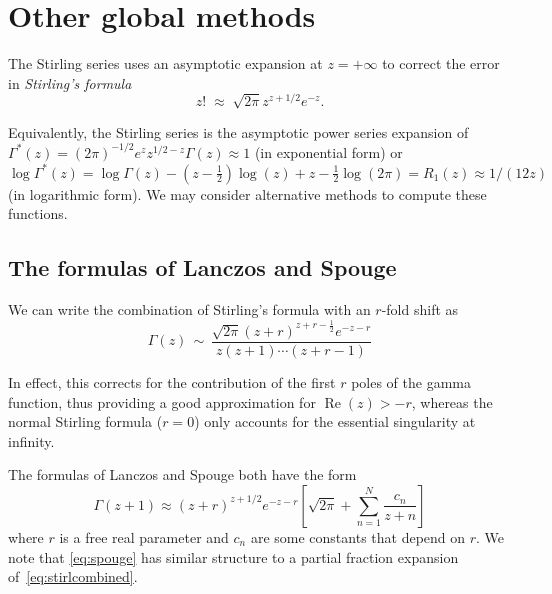 \documentclass[reqno]{amsart}
\theoremstyle{definition}
\begin{document}


\section{Other global methods}

\label{sect:global}


The Stirling series
uses an asymptotic
expansion at $z = +\infty$ to correct the error in \emph{Stirling's formula}
\begin{equation}
z! \; \approx \; \sqrt{2 \pi} z^{z+1/2} e^{-z}.
\end{equation}

Equivalently, the Stirling series is the asymptotic power series expansion
of $\Gamma^{*}(z) = (2 \pi)^{-1/2} e^z {z}^{1/2-z} \Gamma(z) \approx 1$ (in exponential form)
or
$\log \Gamma^{*}(z) = \log \Gamma(z) - (z-\tfrac{1}{2}) \log(z) + z - \tfrac{1}{2} \log(2\pi) = R_1(z) \approx 1/(12 z)$ (in logarithmic form).
We may consider alternative methods to compute these functions.

\subsection{The formulas of Lanczos and Spouge}

We can write the combination of Stirling's formula with an $r$-fold shift as
\begin{equation}
\Gamma(z) \, \sim \, \frac{\sqrt{2 \pi} (z+r)^{z+r-\tfrac{1}{2}} e^{-z-r}}{z (z+1) \cdots (z+r-1)}
\label{eq:stirlcombined}
\end{equation}

In effect, this corrects for the
contribution of the first $r$ poles of the gamma function,
thus providing a good approximation for $\operatorname{Re}(z) > -r$,
whereas the normal Stirling formula ($r = 0$) only accounts for the
essential singularity at infinity.

The formulas of Lanczos and Spouge both have the form~\cite{Spouge1994,laurie2005,causley2021gamma}
\begin{equation}
\Gamma(z+1) \approx (z+r)^{z+1/2} e^{-z-r} \left[ \sqrt{2 \pi} + \sum_{n=1}^{N} \frac{c_n}{z+n} \right]
\label{eq:spouge}
\end{equation}
where $r$ is a free real parameter and
$c_n$ are some constants that depend on $r$.
We note that \eqref{eq:spouge} has similar structure to a partial fraction expansion of~\eqref{eq:stirlcombined}.
\end{document}
